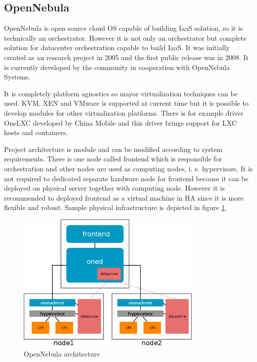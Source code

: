 \subsection{OpenNebula}
OpenNebula is open source cloud OS capable of building IaaS solution, so it is technically an orchestrator. \cite{opennebula} However it is not only an orchestrator but complete solution for datacenter orchestration capable to build \Ac{IaaS}. It was initially created as an research project in 2005 and the first public release was in 2008. It is currently developed by the community in cooperation with OpenNebula Systems.

It is completely platform agnostics so mayor virtualization techniques can be used. \Ac{KVM}, XEN and VMware is supported at current time but it is possible to develop modules for other virtualization platforms. There is for example driver OneLXC developed by China Mobile and this driver brings support for \Ac{LXC} hosts and containers.

Project architecture is module and can be modified according to system requirements. There is one node called frontend which is responsible for orchestration and other nodes are used as computing nodes, i. e. hypervisors. It is not required to dedicated separate hardware node for frontend because it can be deployed on physical server together with computing node. However it is recommended to deployed frontend as a virtual machine in \Ac{HA} since it is more flexible and robust. Sample physical infrastructure is depicted in figure \ref{img:opennebula-arch}.

\begin{figure}[htb]
	\begin{center}
	\includegraphics[width=0.8\textwidth]{opennebula-arch.png}
	\end{center}
	\caption{OpenNebula architecture}
	\label{img:opennebula-arch}
\end{figure}

